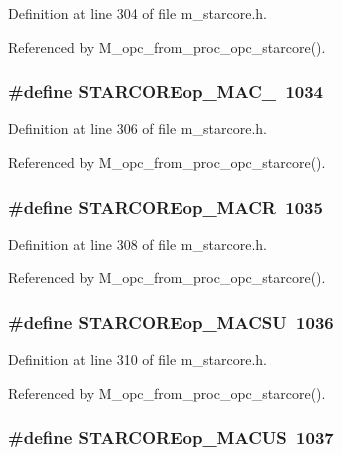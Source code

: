 Definition at line 304 of file m\_\-starcore.h.

Referenced by M\_\-opc\_\-from\_\-proc\_\-opc\_\-starcore().
\subsubsection{\setlength{\rightskip}{0pt plus 5cm}\#define STARCOREop\_\-MAC\_~1034}\label{m__starcore_8h_6fdbe998bb3da349f896160548aa68ee}




Definition at line 306 of file m\_\-starcore.h.

Referenced by M\_\-opc\_\-from\_\-proc\_\-opc\_\-starcore().
\subsubsection{\setlength{\rightskip}{0pt plus 5cm}\#define STARCOREop\_\-MACR~1035}\label{m__starcore_8h_535d642a366526a1435756df193ceb99}




Definition at line 308 of file m\_\-starcore.h.

Referenced by M\_\-opc\_\-from\_\-proc\_\-opc\_\-starcore().
\subsubsection{\setlength{\rightskip}{0pt plus 5cm}\#define STARCOREop\_\-MACSU~1036}\label{m__starcore_8h_a3de7b7f8a01265b237f455fc8e30d43}




Definition at line 310 of file m\_\-starcore.h.

Referenced by M\_\-opc\_\-from\_\-proc\_\-opc\_\-starcore().
\subsubsection{\setlength{\rightskip}{0pt plus 5cm}\#define STARCOREop\_\-MACUS~1037}\label{m__starcore_8h_861bd6274d8e46b4cb50d06689e23372}





